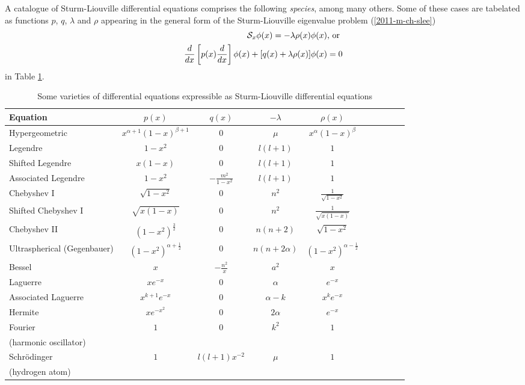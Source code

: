 A catalogue of Sturm-Liouville differential equations
comprises the following {\it species}, among many others.\cite[-15mm]{arfken05,Al-Gwaiz,everitt-handbook-sl}
Some of these cases are
tabelated as functions   $p$, $q$, $\lambda$ and $\rho$ appearing in the general form
of the Sturm-Liouville eigenvalue problem  (\ref{2011-m-ch-slee})
\begin{equation}
\begin{split}
{\cal S}_{x}    \phi (x) = -\lambda \rho  (x) \phi (x)\textrm{, or } \\
\frac{d}{dx}
\left[
p(x)
\frac{d}{dx}
\right] \phi(x)
+
[q(x)  +   \lambda \rho  (x) ]\phi(x)=0
\end{split}
\end{equation}
in Table \ref{2011-m-sl-t-varieties}.
\begin{table}
{\footnotesize
\begin{tabular}{lccccccccc}
\hline\hline
Equation & $ p(x)$ & $q(x)$ & $-\lambda$ & $\rho (x)$\\
\hline
Hypergeometric  & $x^{\alpha+1}(1-x)^{\beta +1} $ &   $0$ &  $ \mu $ &  $x^{\alpha}(1-x)^{\beta }$
\\
Legendre  & $1-x^2 $ &   $0$ &  $l(l+1) $ &  $1$
\\
Shifted Legendre    & $ x(1-x)$ &   $0$ &  $l(l+1) $ &  $1$
\\
Associated Legendre    & $1-x^2 $ &   $-\frac{m^2}{1-x^2}$ &  $l(l+1) $ &  $1$
\\
Chebyshev I   & $\sqrt{1-x^2} $ &   $0$ &  $n^2 $ &  $ \frac{1}{\sqrt{1-x^2}}$
\\
Shifted Chebyshev I   & $\sqrt{x(1-x)} $ &   $0$ &  $n^2 $ &  $ \frac{1}{\sqrt{x(1-x)}}$
\\
Chebyshev II   & $(1-x^2)^\frac{3}{2} $ &   $0$ &  $n(n+2) $ &  $  \sqrt{1-x^2} $
\\
Ultraspherical (Gegenbauer)   & $(1-x^2)^{\alpha + \frac{1}{2}} $ &   $0$ &  $n(n+2\alpha ) $ &  $  (1-x^2)^{\alpha - \frac{1}{2}}$
\\
Bessel   & $ x$ &   $-\frac{n^2}{x}$ &  $a^2 $ &  $ x$
\\
Laguerre   & $x e^{-x} $ &   $0$ &  $\alpha $ &  $e^{-x} $
\\
Associated Laguerre     & $x^{k+1} e^{-x} $ &   $0$ &  $\alpha -k$ &  $x^ke^{-x} $
\\
Hermite     & $x e^{-x^2} $ &   $0$ &  $2\alpha $ &  $e^{-x} $
\\
Fourier    & $1 $ &   $0$ &  $ k^2 $ &  $1$
\\
(harmonic oscillator)    &   &     &  $  $ &  $ $  \\
Schr\"odinger    & $1 $ &   $l(l+1)x^{-2}$ &  $ \mu $ &  $1$
\\
(hydrogen atom)    &   &     &  $  $ &  $ $  \\
\hline\hline
\end{tabular}
}
\caption{Some varieties of differential equations expressible as Sturm-Liouville differential equations}
\label{2011-m-sl-t-varieties}
\end{table}

